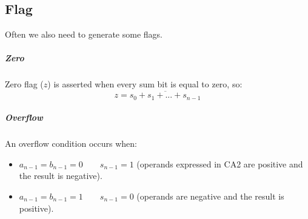 
\subsection{Flag}
Often we also need to generate some flags.

\subparagraph{Zero}
Zero flag ($z$) is asserted when every sum bit is equal to zero, so:
$$z=\overline{s_0+s_1+...+s_{n-1}} $$

\subparagraph{Overflow}

An overflow condition occurs when:
\begin{itemize}
  \item $a_{n-1}=b_{n-1}=0 \qquad s_{n-1}=1 $ (operands expressed in CA2 are positive and the result is negative).

  \item $a_{n-1}=b_{n-1}=1 \qquad s_{n-1}=0$ (operands are negative and the result is positive).
\end{itemize}

